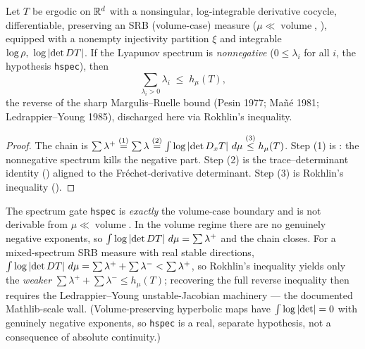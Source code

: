 \begin{theorem}\label{sumPosExp_le_ksEntropy_of_SRB}
  \leanok
  Let \(T\) be ergodic on \(\mathbb{R}^d\) with a nonsingular, log-integrable derivative cocycle,
  differentiable, preserving an SRB (volume-case) measure (\(\mu\ll\operatorname{volume}\),
  ), equipped with a nonempty injectivity partition \(\xi\) and integrable
  \(\log\rho,\ \log\left\lvert \det DT \right\rvert\). If the Lyapunov spectrum is \emph{nonnegative}
  (\(0\le\lambda_i\) for all \(i\), the hypothesis \texttt{hspec}), then
  \[
    \sum_{\lambda_i>0}\lambda_i \;\le\; h_\mu(T) ,
  \]
  the reverse of the sharp Margulis--Ruelle bound (Pesin 1977; Ma\~n\'e 1981; Ledrappier--Young
  1985), discharged here via Rokhlin's inequality.
\end{theorem}
\begin{proof}\leanok
  The chain is \(\sum\lambda^{+}\overset{(1)}{=}\sum\lambda\overset{(2)}{=}\int\log\left\lvert \det
  D_xT \right\rvert\,d\mu\overset{(3)}{\le}h_\mu(T)\). Step (1) is
  : the nonnegative spectrum kills the negative part. Step
  (2) is the trace--determinant identity () aligned to the
  Fr\'echet-derivative determinant. Step (3) is Rokhlin's inequality
  ().
\end{proof}

The spectrum gate \texttt{hspec} is \emph{exactly} the volume-case boundary and is not derivable
from \(\mu\ll\operatorname{volume}\). In the volume regime there are no genuinely negative
exponents, so \(\int\log\left\lvert \det DT \right\rvert\,d\mu=\sum\lambda^{+}\) and the chain closes. For a
mixed-spectrum SRB measure with real stable directions,
\(\int\log\left\lvert \det DT \right\rvert\,d\mu=\sum\lambda^{+}+\sum\lambda^{-}<\sum\lambda^{+}\), so Rokhlin's
inequality yields only the \emph{weaker} \(\sum\lambda^{+}+\sum\lambda^{-}\le h_\mu(T)\); recovering
the full reverse inequality then requires the Ledrappier--Young unstable-Jacobian machinery --- the
documented Mathlib-scale wall. (Volume-preserving hyperbolic maps have
\(\int\log\left\lvert \det \right\rvert=0\) with genuinely negative exponents, so \texttt{hspec} is a real, separate
hypothesis, not a consequence of absolute continuity.)

